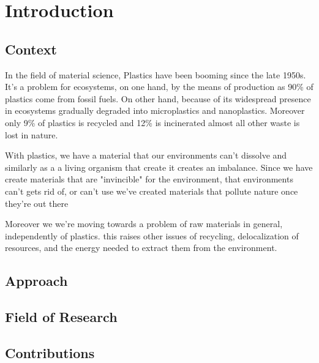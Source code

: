 \chapter{Introduction}

\section{Context}

In the field of material science, Plastics have been booming since the late 1950s\cite{geyer2017production}.
It's a problem for ecosystems, on one hand, by the means of production as 90\% of plastics come from fossil fuels. On other hand,
because of its widespread presence in ecosystems gradually degraded into microplastics and nanoplastics.
Moreover only 9\% of plastics is recycled and 12\% is incinerated almost all other waste is lost in nature\cite{natureeditorial}.

With plastics, we have a material that our environments can't dissolve and similarly as a a living organism that create
it creates an imbalance. Since we have create materials that are "invincible" for the environment,  that environments can't gets rid of, or can't use
we've created materials that pollute nature once they're out there

Moreover we we're moving towards a problem of raw materials in general, independently of plastics. this raises other issues of recycling, 
delocalization of resources, and the energy needed to extract them from the environment.



\section{Approach}

\section{Field of Research}
\section{Contributions}